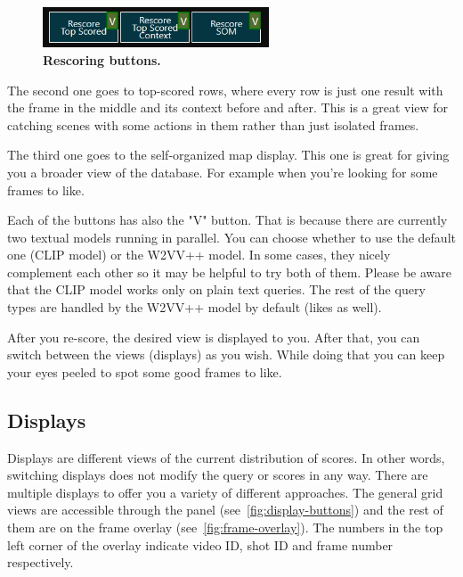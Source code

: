 \begin{figure}[h]
	\centering
	\includegraphics[width=0.6\textwidth]{img/rescore-buttons.png}
  \caption{\textbf{Rescoring buttons.}}
	\label{fig:rescore}
\end{figure}

The second one goes to top-scored rows, where every row is just one result with the frame in the middle and its context before and after. This is a great view for catching scenes with some actions in them rather than just isolated frames.

The third one goes to the self-organized map display. This one is great for giving you a broader view of the database. For example when you're looking for some frames to like.

Each of the buttons has also the "V" button. That is because there are currently two textual models running in parallel. You can choose whether to use the default one (CLIP model) or the W2VV++ model. In some cases, they nicely complement each other so it may be helpful to try both of them. Please be aware that the CLIP model works only on plain text queries. The rest of the query types are handled by the W2VV++ model by default (likes as well).

After you re-score, the desired view is displayed to you. After that, you can switch between the views (displays) as you wish. While doing that you can keep your eyes peeled to spot some good frames to like.

\pagebreak
\subsection{Displays}

Displays are different views of the current distribution of scores. In other words, switching displays does not modify the query or scores in any way. 
There are multiple displays to offer you a variety of different approaches.
The general grid views are accessible through the panel (see~\cref{fig:display-buttons}) and the rest of them are on the frame overlay (see~\cref{fig:frame-overlay}). The numbers in the top left corner of the overlay indicate video ID, shot ID and frame number respectively.

